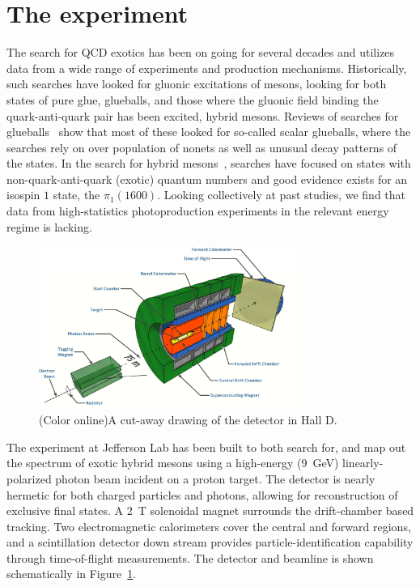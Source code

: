 \section[The \gx{} experiment (Curtis)]{\label{sec:gluexexperiment} The \gx{} experiment}
The search for QCD exotics has been on going for several decades and utilizes data from a wide range of experiments and production mechanisms. Historically, such searches have looked for gluonic excitations of mesons, looking for both states of pure glue, glueballs, and those where the gluonic field binding the quark-anti-quark pair has been excited, hybrid mesons. Reviews of searches for glueballs~\cite{Crede:2008vw} show that most of these looked for so-called scalar glueballs, where the searches rely on over population of nonets as well as unusual decay patterns of the states. In the search for hybrid mesons~\cite{Meyer:2010ku,Meyer:2015eta}, searches have focused on states with non-quark-anti-quark (exotic) quantum numbers and good evidence exists for an isospin $1$ state, the $\pi_{1}(1600)$. Looking collectively at past studies, we find that data from high-statistics photoproduction experiments in the relevant energy regime is lacking. 

\begin{figure}[h!]\centering
\includegraphics[width=0.75\textwidth]{figures/GlueX-graphic.jpg}
\caption[]{\label{fig:gluex_cut-away}(Color online)A cut-away drawing of the \GX{} detector in Hall D.}
\end{figure}
The \gx{} experiment at Jefferson Lab has been built to both search for, and map out the spectrum of exotic hybrid mesons using a high-energy (9~GeV) linearly-polarized photon beam incident on a proton target\cite{gluex-ref}. The detector is nearly hermetic for both charged particles and photons, allowing for reconstruction of exclusive final states. A 2~T solenoidal magnet surrounds the drift-chamber based tracking. Two electromagnetic calorimeters cover the central and forward regions, and a scintillation detector down stream provides particle-identification capability through time-of-flight measurements. The \gx{} detector and beamline is shown schematically in Figure~\ref{fig:gluex_cut-away}.


